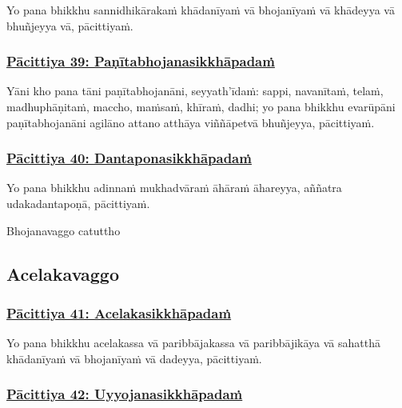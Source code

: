 Yo pana bhikkhu sannidhikārakaṁ khādanīyaṁ vā bhojanīyaṁ vā khādeyya vā bhuñjeyya vā, pācittiyaṁ.



\subsubsection*{\hyperref[exp39]{Pācittiya 39: Paṇītabhojanasikkhāpadaṁ}}
\label{pac39}

Yāni kho pana tāni paṇītabhojanāni, seyyath'īdaṁ: sappi, navanītaṁ, telaṁ, madhuphāṇitaṁ, maccho, maṁsaṁ, khīraṁ, dadhi; yo pana bhikkhu evarūpāni paṇītabhojanāni agilāno attano atthāya viññāpetvā bhuñjeyya, pācittiyaṁ.



\subsubsection*{\hyperref[exp40]{Pācittiya 40: Dantaponasikkhāpadaṁ}}
\label{pac40}

Yo pana bhikkhu adinnaṁ mukhadvāraṁ āhāraṁ āhareyya, aññatra udakadantapoṇā, pācittiyaṁ.

\begin{center}
	Bhojanavaggo catuttho
\end{center}



\subsection{Acelakavaggo}

\subsubsection*{\hyperref[exp41]{Pācittiya 41: Acelakasikkhāpadaṁ}}
\label{pac41}

Yo pana bhikkhu acelakassa vā paribbājakassa vā paribbājikāya vā sahatthā khādanīyaṁ vā bhojanīyaṁ vā dadeyya, pācittiyaṁ.



\subsubsection*{\hyperref[exp42]{Pācittiya 42: Uyyojanasikkhāpadaṁ}}
\label{pac42}

